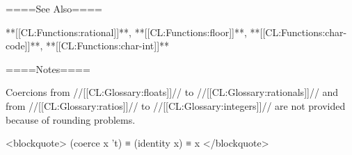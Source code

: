 ====See Also====

**[[CL:Functions:rational]]**, **[[CL:Functions:floor]]**, **[[CL:Functions:char-code]]**, **[[CL:Functions:char-int]]**

====Notes====

Coercions from //[[CL:Glossary:floats]]// to //[[CL:Glossary:rationals]]// and from //[[CL:Glossary:ratios]]// to //[[CL:Glossary:integers]]// are not provided because of rounding problems.

<blockquote> (coerce x 't) ≡ (identity x) ≡ x </blockquote>

      
